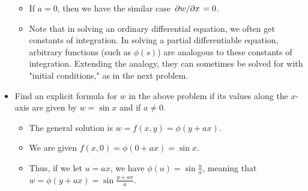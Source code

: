 \documentclass[../main.tex]{subfiles}
\begin{document}
\begin{itemize}
\begin{itemize}
        \item If $a=0$, then we have the similar case $\pdv*{w}{x}=0$.
        \item Note that in solving an ordinary differential equation, we often get constants of integration. In solving a partial differentiable equation, arbitrary functions (such as $\phi(s)$) are analogous to these constants of integration. Extending the analogy, they can sometimes be solved for with "initial conditions," as in the next problem.
    \end{itemize}
    \item Find an explicit formula for $w$ in the above problem if its values along the $x$-axis are given by $w=\sin x$ and if $a\neq 0$.
    \begin{itemize}
        \item The general solution is $w=f(x,y)=\phi(y+ax)$.
        \item We are given $f(x,0)=\phi(0+ax)=\sin x$.
        \item Thus, if we let $u=ax$, we have $\phi(u)=\sin\frac{u}{a}$, meaning that $w=\phi(y+ax)=\sin\frac{y+ax}{a}$.
    \end{itemize}
\end{itemize}
\end{document}

